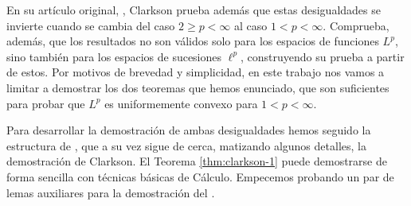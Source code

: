 En su artículo original, \cite{clarkson}, Clarkson prueba además que estas desigualdades se invierte cuando se cambia del caso $ 2 \geq p < \infty $ al caso $ 1 < p < \infty $. Comprueba, además, que los resultados no son válidos solo para los espacios de funciones $ L^p $, sino también para los espacios de sucesiones $ \ell^p $, construyendo su prueba a partir de estos. Por motivos de brevedad y simplicidad, en este trabajo nos vamos a limitar a demostrar los dos teoremas que hemos enunciado, que son suficientes para probar que $ L^p $ es uniformemente convexo para $ 1 < p < \infty $.

Para desarrollar la demostración de ambas desigualdades hemos seguido la estructura de \cite{hewitt}, que a su vez sigue de cerca, matizando algunos detalles, la demostración de Clarkson. El Teorema \ref{thm:clarkson-1} puede demostrarse de forma sencilla con técnicas básicas de Cálculo. Empecemos probando un par de lemas auxiliares para la demostración del .

